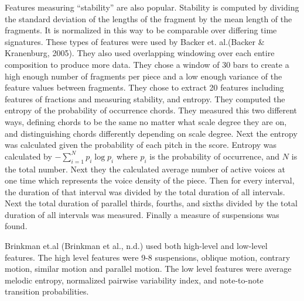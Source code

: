 \documentclass[12pt,twoside]{reedthesis}
\theoremstyle{definition}
\theoremstyle{definition}
\theoremstyle{definition}
\theoremstyle{remark}
\begin{document}
Features measuring ``stability'' are also popular. Stability is computed
by dividing the standard deviation of the lengths of the fragment by the
mean length of the fragments. It is normalized in this way to be
comparable over differing time signatures. These types of features were
used by Backer et. al.(Backer \& Kranenburg, 2005). They also used
overlapping windowing over each entire composition to produce more data.
They chose a window of 30 bars to create a high enough number of
fragments per piece and a low enough variance of the feature values
between fragments. They chose to extract 20 features including features
of fractions and measuring stability, and entropy. They computed the
entropy of the probability of occurrence chords. They measured this two
different ways, defining chords to be the same no matter what scale
degree they are on, and distinguishing chords differently depending on
scale degree. Next the entropy was calculated given the probability of
each pitch in the score. Entropy was calculated by
\(-\sum_{i = 1}^{N}p_i\log{p_i}\) where \(p_i\) is the probability of
occurrence, and \(N\) is the total number. Next they the calculated
average number of active voices at one time which represents the voice
density of the piece. Then for every interval, the duration of that
interval was divided by the total duration of all intervals. Next the
total duration of parallel thirds, fourths, and sixths divided by the
total duration of all intervals was measured. Finally a measure of
suspensions was found.

Brinkman et.al (Brinkman et al., n.d.) used both high-level and
low-level features. The high level features were 9-8 suspensions,
oblique motion, contrary motion, similar motion and parallel motion. The
low level features were average melodic entropy, normalized pairwise
variability index, and note-to-note transition probabilities.
\end{document}
